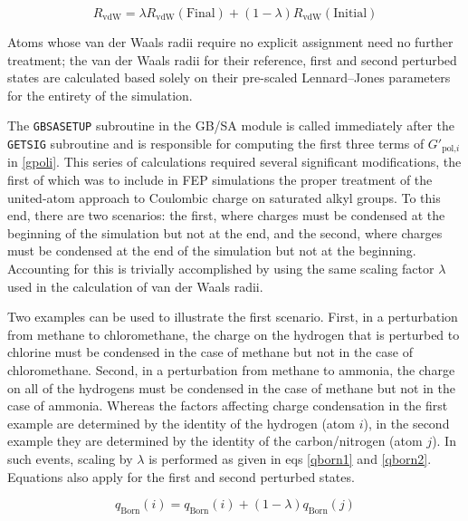\documentclass[12pt]{report}
\begin{document}
\vspace*{-0.7cm}
\begin{equation}
\label{rvdwif}
R_{ \textrm{vdW}} = \lambda R_{ \textrm{vdW}}(\textrm{Final}) + (1 - \lambda) R_{ \textrm{vdW}}(\textrm{Initial})
\end{equation}

Atoms whose van der Waals radii require no explicit assignment need no further treatment; the van der Waals radii for their reference, first and second perturbed states are calculated based solely on their pre-scaled Lennard--Jones parameters for the entirety of the simulation.

The {\tt GBSASETUP} subroutine in the GB/SA module is called immediately after the {\tt GETSIG} subroutine and is responsible for computing the first three terms of $G'_{\textrm{pol,}i}$ in \cref{gpoli}. This series of calculations required several significant modifications, the first of which was to include in FEP simulations the proper treatment of the united-atom approach to Coulombic charge on saturated alkyl groups. To this end, there are two scenarios: the first, where charges must be condensed at the beginning of the simulation but not at the end, and the second, where charges must be condensed at the end of the simulation but not at the beginning. Accounting for this is trivially accomplished by using the same scaling factor $\lambda$ used in the calculation of van der Waals radii.

Two examples can be used to illustrate the first scenario. First, in a perturbation from methane to chloromethane, the charge on the hydrogen that is perturbed to chlorine must be condensed in the case of methane but not in the case of chloromethane. Second, in a perturbation from methane to ammonia, the charge on all of the hydrogens must be condensed in the case of methane but not in the case of ammonia. Whereas the factors affecting charge condensation in the first example are determined by the identity of the hydrogen (atom $i$), in the second example they are determined by the identity of the carbon/nitrogen (atom $j$). In such events, scaling by $\lambda$ is performed as given in eqs \ref{qborn1} and \ref{qborn2}. Equations also apply for the first and second perturbed states.

\vspace*{-0.4cm}
\begin{equation}
\label{qborn1}
q_{\textrm{Born}}(i) = q_{\textrm{Born}}(i) + (1 - \lambda) q_{\textrm{Born}}(j)
\end{equation}
\vspace*{-1.7cm}
\end{document}
